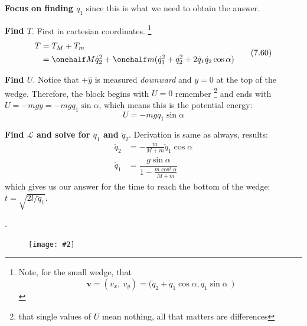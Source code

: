 \documentclass[10pt, twocolumn]{article}
\newcommand\myfig[2][0.3\textwidth]{\begin{figure}[h!]\centering\texttt{[image: \#2]}\end{figure}}
\newcommand{\myspace}{\vspace{3\bigskipamount}}
\newcommand\p{\Needspace{10\baselineskip} \noindent}
\newcommand\tlab[1]{\tag{#1}\label{#1}}
\begin{document}
\begin{compactitem}
	\item \textbf{Focus on finding $\ddot q_1$} since this is what we need to obtain the answer. 
	\item \textbf{Find $T$}. First in cartesian coordinates. \footnote{Note, for the small wedge, that 
		$$
		\bm v = (v_x, ~ v_y) = \big( \dot q_2 + \dot q_1 \cos\alpha, \dot q_1 \sin\alpha ~~ \big)
		$$
	}
	\begin{align}
	\begin{split}
		T &= T_M + T_m \\
		&= \onehalf M \dot q_2^2
		+ \onehalf m (\dot q_1^2 + \dot q_2^2 +  2 \dot q_1 \dot q_2 \cos\alpha) 
	\end{split}\tlab{7.60}
	\end{align}
	
	\item \textbf{Find $U$}. Notice that $+\hat y$ is measured \textit{downward} and $y = 0$ at the top of the wedge. Therefore, the block begins with $U = 0$ remember \footnote{that single values of $U$ mean nothing, all that matters are differences} and ends with $U = -mgy= -mgq_1 \sin \alpha $, which means this is the potential energy:
	$$ U = -mgq_1 \sin \alpha $$
	
	
	\item \textbf{Find $\mathcal L$ and solve for $\ddot q_1$ and $\ddot q_2$}. Derivation is same as always, results:
	\begin{align}
		\ddot q_2 &= - \frac{m}{M + m} \ddot q_1 \cos\alpha \tlab{7.66} \\
		\ddot q_1 &= \dfrac{g\sin\alpha}{1 - \frac{m\cos^2\alpha}{M + m}} \tlab{7.67} 
	\end{align}
	which gives us our answer for the time to reach the bottom of the wedge: $t = \sqrt{2l/\ddot q_1}$. 
\end{compactitem}



\myspace
\p {}. 
\myfig[0.15\textwidth]{BeadHoop.PNG}
\end{document}
